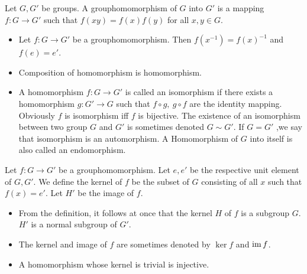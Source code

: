 \begin{definition}[Grouphomomorphism]
    Let $G,G'$ be groups. A grouphomomorphism of $G$ into $G'$ is a mapping $f:G\to G'$ such that $f(xy) = f(x)f(y)$ for all $x,y\in G$.
\end{definition}
\begin{remark}
    \begin{itemize}
        \item Let $f:G\to G'$ be a grouphomomorphism. Then $f(x^{-1})= f(x)^{-1}$ and $f(e)= e'$.
        \item Composition of homomorphism is homomorphism.
        \item A homomorphism $f:G\to G'$ is called an isomorphism if there exists a homomorphism $g:G' \to G $ such that $f\circ g ,\ g \circ f$ are the identity mapping. Obviously $f$ is isomorphism iff $f$ is bijective. The existence of an isomorphism between two group $G$ and $G'$ is sometimes denoted $G\sim G'$. If $G= G'$ ,we say that isomorphism is an automorphism. A Homomorphism of $G$ into itself is also called an endomorphism.
    \end{itemize}
    
\end{remark}

\begin{definition}
    Let $f:G\to G'$ be a grouphomomorphism. Let $e,e'$ be the respective unit element of $G,G'$. We define the kernel of $f$ be the subset of $G$ consisting of all $x$ such that $f(x) = e'$. Let $H'$ be the image of $f$.
\end{definition}
\begin{remark}
    \begin{itemize}
    \item From the definition, it follows at once that the kernel $H$ of $f$ is a subgroup $G$. $H'$ is a normal subgroup of $G'$.
    \item The kernel and image of $f$ are sometimes denoted by $\ker f$ and $\operatorname{im} f$.
    \item A homomorphism whose kernel is trivial is injective.
\end{itemize}
\end{remark}


